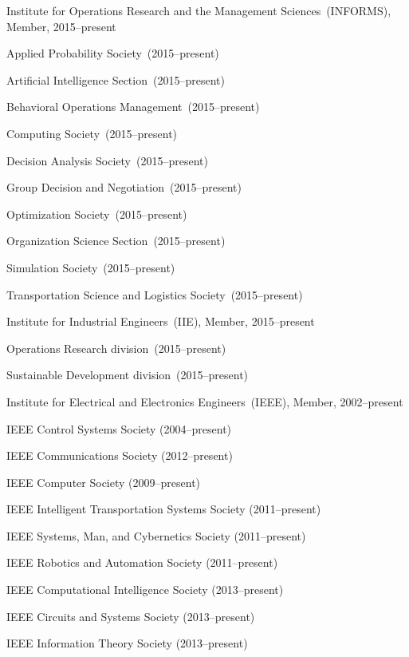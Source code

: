 \documentclass[10pt]{article}
\newcommand{\halfblankline}{\quad\vspace{-0.5\baselineskip}\pagebreak[3]}
\begin{document}
Institute for Operations Research and the Management Sciences~(INFORMS), Member, 2015--present
%
\begin{innerlist}
\item Applied Probability Society~(2015--present)
\item Artificial Intelligence Section~(2015--present)
\item Behavioral Operations Management~(2015--present)
\item Computing Society~(2015--present)
\item Decision Analysis Society~(2015--present)
\item Group Decision and Negotiation~(2015--present)
\item Optimization Society~(2015--present)
\item Organization Science Section~(2015--present)
\item Simulation Society~(2015--present)
\item Transportation Science and Logistics Society~(2015--present)
\end{innerlist}

\halfblankline

Institute for Industrial Engineers~(IIE), Member, 2015--present
%
\begin{innerlist}
\item Operations Research division~(2015--present)
\item Sustainable Development division~(2015--present)
\end{innerlist}

\halfblankline

Institute for Electrical and Electronics Engineers~(IEEE), Member,
2002--present
%
\begin{innerlist}
\item IEEE Control Systems Society (2004--present)
\item IEEE Communications Society (2012--present)
\item IEEE Computer Society (2009--present)
\item IEEE Intelligent Transportation Systems Society (2011--present)
\item IEEE Systems, Man, and Cybernetics Society (2011--present)
\item IEEE Robotics and Automation Society (2011--present)
\item IEEE Computational Intelligence Society (2013--present)
\item IEEE Circuits and Systems Society (2013--present)
\item IEEE Information Theory Society (2013--present)
\end{innerlist}
\end{document}
